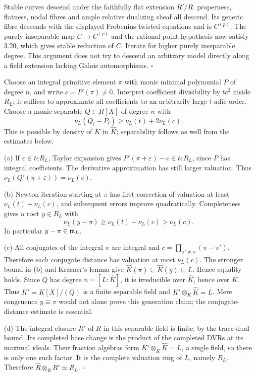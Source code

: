 \documentclass[11pt]{article}
\let\chapterexercise\exercise
\renewcommand{\exercise}[2]{\Needspace{8\baselineskip}\chapterexercise{#1}{#2}}
\begin{document}
Stable curves descend under the faithfully flat extension $R'/R$: properness, flatness, nodal fibres and ample relative dualizing sheaf all descend. Its generic fibre descends with the displayed Frobenius-twisted equations and is $C^{(p)}$. The purely inseparable map $C\to C^{(p)}$ and the rational-point hypothesis now satisfy 3.20, which gives stable reduction of $C$. Iterate for higher purely inseparable degree. This argument does not try to descend an arbitrary model directly along a field extension lacking Galois automorphisms. \hfill$\square$

\pf Choose an integral primitive element $\pi$ with monic minimal polynomial $P$ of degree $n$, and write $c=P'(\pi)\ne0$. Interpret coefficient divisibility by $tc^2$ inside $R_L$; it suffices to approximate all coefficients to an arbitrarily large $t$-adic order. Choose a monic separable $Q\in R[X]$ of degree $n$ with
\[ \nu_L(Q_i-P_i)\ge\nu_L(t)+2\nu_L(c). \]
This is possible by density of $K$ in $\widehat K$; separability follows as well from the estimates below.

(a) If $\varepsilon\in tcR_L$, Taylor expansion gives $P'(\pi+\varepsilon)-c\in tcR_L$, since $P$ has integral coefficients. The derivative approximation has still larger valuation. Thus $\nu_L(Q'(\pi+\varepsilon))=\nu_L(c)$.

(b) Newton iteration starting at $\pi$ has first correction of valuation at least $\nu_L(t)+\nu_L(c)$, and subsequent errors improve quadratically. Completeness gives a root $y\in R_L$ with
\[ \nu_L(y-\pi)\ge\nu_L(t)+\nu_L(c)>\nu_L(c). \]
In particular $y-\pi\in\mathfrak m_L$.

(c) All conjugates of the integral $\pi$ are integral and $c=\prod_{\pi'\ne\pi}(\pi-\pi')$. Therefore each conjugate distance has valuation at most $\nu_L(c)$. The stronger bound in (b) and Krasner's lemma give $\widehat K(\pi)\subseteq\widehat K(y)\subseteq L$. Hence equality holds. Since $Q$ has degree $n=[L:\widehat K]$, it is irreducible over $\widehat K$, hence over $K$. Thus $K'=K[X]/(Q)$ is a finite separable field and $K'\otimes_K\widehat K=L$. Mere congruence $y\equiv\pi$ would not alone prove this generation claim; the conjugate-distance estimate is essential.

(d) The integral closure $R'$ of $R$ in this separable field is finite, by the trace-dual bound. Its completed base change is the product of the completed DVRs at its maximal ideals. Their fraction algebras form $K'\otimes_K\widehat K=L$, a single field, so there is only one such factor. It is the complete valuation ring of $L$, namely $R_L$. Therefore $\widehat R\otimes_RR'\simeq R_L$. \hfill$\square$
\end{document}
